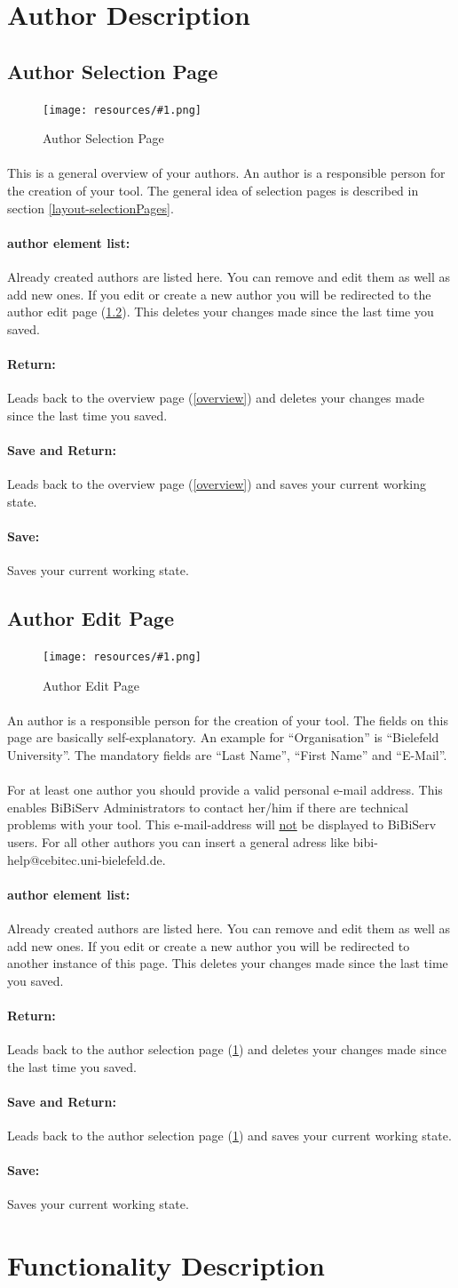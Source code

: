 \documentclass[a4paper,10pt]{book}
\newcommand{\bigpic}[1]{\texttt{[image: resources/\#1.png]}}
\newcommand{\buttonsDetail}[1]{
\paragraph{Return:} Leads back to #1 and deletes your changes made since the last time you saved.
\paragraph{Save and Return:} Leads back to #1 and saves your current working state.
\paragraph{Save:} Saves your current working state.
}
\newcommand{\newElem}[2]{
\paragraph{#1 element list:} Already created #1s are listed here. You can remove and edit them as well as add new ones. If you edit or create a new #1 you will be redirected to #2. This deletes your changes made since the last time you saved.
}
\newcommand{\selectionPage}[3]{
\paragraph{}This is a general overview of your #1s. #2 The general idea of selection pages is described in section \ref{layout-selectionPages}.
\newElem{#1}{#3}
}
\begin{document}
\section{Author Description}
\label{authorSelection}

\subsection{Author Selection Page}
\begin{figure}
 \bigpic{authorSelection}
 \caption{Author Selection Page}
\end{figure}

\selectionPage{author}{An author is a responsible person for the creation of your tool.}{the author edit page (\ref{author})}
\buttonsDetail{the overview page (\ref{overview})}

\subsection{Author Edit Page}
\label{author}

\begin{figure}
 \bigpic{author}
 \caption{Author Edit Page}
\end{figure}

\paragraph{} An author is a responsible person for the creation of your tool. The fields on this page are basically self-explanatory. An example for ``Organisation'' is ``Bielefeld University''. The mandatory fields are ``Last Name'', ``First Name'' and ``E-Mail''.
\paragraph{} For at least one author you should provide a valid personal e-mail address. This enables BiBiServ Administrators to contact her/him if there are technical problems with your tool. This e-mail-address will \underline{not} be displayed to BiBiServ users. For all other authors you can insert a general adress like bibi-help@cebitec.uni-bielefeld.de.
\newElem{author}{another instance of this page}
\buttonsDetail{the author selection page (\ref{authorSelection})}

\section{Functionality Description}
\end{document}

